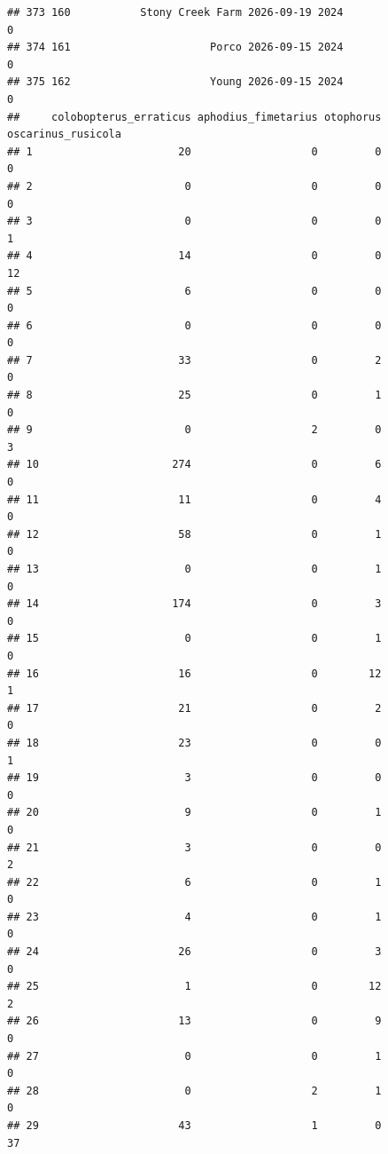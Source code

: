\documentclass[
]{article}
\begin{document}
\begin{verbatim}
## 373 160           Stony Creek Farm 2026-09-19 2024                       0
## 374 161                      Porco 2026-09-15 2024                       0
## 375 162                      Young 2026-09-15 2024                       0
##     colobopterus_erraticus aphodius_fimetarius otophorus oscarinus_rusicola
## 1                       20                   0         0                  0
## 2                        0                   0         0                  0
## 3                        0                   0         0                  1
## 4                       14                   0         0                 12
## 5                        6                   0         0                  0
## 6                        0                   0         0                  0
## 7                       33                   0         2                  0
## 8                       25                   0         1                  0
## 9                        0                   2         0                  3
## 10                     274                   0         6                  0
## 11                      11                   0         4                  0
## 12                      58                   0         1                  0
## 13                       0                   0         1                  0
## 14                     174                   0         3                  0
## 15                       0                   0         1                  0
## 16                      16                   0        12                  1
## 17                      21                   0         2                  0
## 18                      23                   0         0                  1
## 19                       3                   0         0                  0
## 20                       9                   0         1                  0
## 21                       3                   0         0                  2
## 22                       6                   0         1                  0
## 23                       4                   0         1                  0
## 24                      26                   0         3                  0
## 25                       1                   0        12                  2
## 26                      13                   0         9                  0
## 27                       0                   0         1                  0
## 28                       0                   2         1                  0
## 29                      43                   1         0                 37

\end{verbatim}
\end{document}
